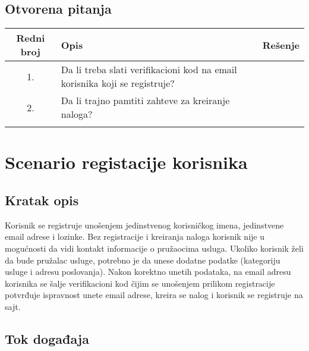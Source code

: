 \documentclass[a4paper,12pt]{report}
\newcommand{\genitivfunkcionalnosti}{registacije korisnika}
\begin{document}
\subsection{Otvorena pitanja}
    \begin{center}
    \begin{tabular}{ |c|p{10cm}|l| }
    \hline
    \textbf{Redni broj} & \hspace{4cm} \textbf{Opis} & \textbf{Rešenje} \\ 
    \hline
         1. & Da li treba slati verifikacioni kod na email 
         korisnika koji se registruje? & \\
         \hline
          2.& Da li trajno pamtiti zahteve za kreiranje naloga? &  \\
         \hline
         & &   \\ 
         \hline
    \end{tabular}
    \end{center}
    
\section{Scenario \genitivfunkcionalnosti}
\subsection{Kratak opis}
    Korisnik se registruje unošenjem jedinstvenog korisničkog imena, jedinstvene email adrese i lozinke. Bez registracije i kreiranja naloga korisnik nije u mogućnosti da vidi kontakt informacije o pružaocima usluga. Ukoliko korisnik želi da bude pružalac usluge, potrebno je da unese dodatne podatke (kategoriju usluge i adresu poslovanja). Nakon korektno unetih podataka, na email adresu korisnika se šalje verifikacioni kod čijim se unošenjem prilikom registracije potvrđuje ispravnost unete email adrese, kreira se nalog i korisnik se registruje na sajt. 
    \newpage
\subsection{Tok događaja}
\end{document}
